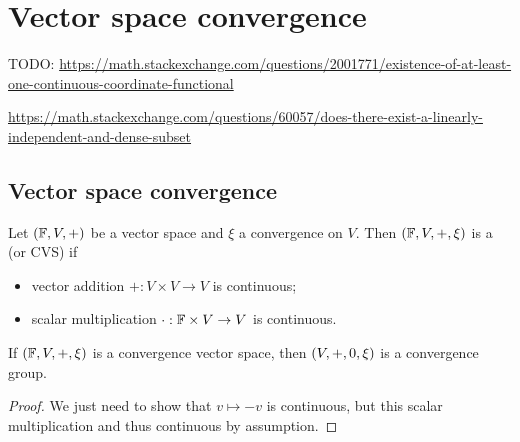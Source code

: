 \chapter{Vector space convergence}

TODO: \url{https://math.stackexchange.com/questions/2001771/existence-of-at-least-one-continuous-coordinate-functional}

\url{https://math.stackexchange.com/questions/60057/does-there-exist-a-linearly-independent-and-dense-subset}

\section{Vector space convergence}
\begin{definition}
Let $\left( \mathbb{F},V,+ \right)$ be a vector space and $\xi$ a convergence on $V$. Then $\left( \mathbb{F},V,+, \xi \right)$ is a  (or CVS) if
\begin{itemize}
\item vector addition $+: V\times V \to V$ is continuous;
\item scalar multiplication $\cdot: \mathbb{F}\times V \to V$ is continuous.
\end{itemize}
\end{definition}

\begin{lemma}
If $\left( \mathbb{F},V,+, \xi \right)$ is a convergence vector space, then $\left( V,+, 0, \xi \right)$ is a convergence group.
\end{lemma}
\begin{proof}
We just need to show that $v\mapsto -v$ is continuous, but this scalar multiplication and thus continuous by assumption.
\end{proof}

